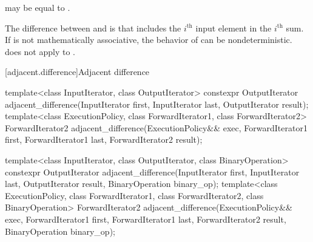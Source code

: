 \begin{itemdescr}
\pnum
\remarks
{} may be equal to .

\pnum
\begin{note}
The difference between  and
 is that 
includes the $i^\text{th}$ input element in the $i^\text{th}$ sum.
If  is not mathematically associative,
the behavior of  can be nondeterministic.
 does not
apply  to .
\end{note}
\end{itemdescr}

[adjacent.difference]{Adjacent difference}

%
\begin{itemdecl}
template<class InputIterator, class OutputIterator>
  constexpr OutputIterator
    adjacent_difference(InputIterator first, InputIterator last,
                        OutputIterator result);
template<class ExecutionPolicy, class ForwardIterator1, class ForwardIterator2>
  ForwardIterator2
    adjacent_difference(ExecutionPolicy&& exec,
                        ForwardIterator1 first, ForwardIterator1 last, ForwardIterator2 result);

template<class InputIterator, class OutputIterator, class BinaryOperation>
  constexpr OutputIterator
    adjacent_difference(InputIterator first, InputIterator last,
                        OutputIterator result, BinaryOperation binary_op);
template<class ExecutionPolicy, class ForwardIterator1, class ForwardIterator2,
         class BinaryOperation>
  ForwardIterator2
    adjacent_difference(ExecutionPolicy&& exec,
                        ForwardIterator1 first, ForwardIterator1 last,
                        ForwardIterator2 result, BinaryOperation binary_op);
\end{itemdecl}


